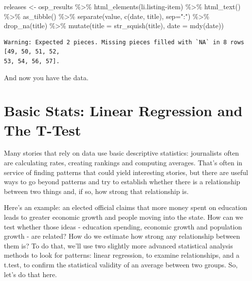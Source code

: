 \documentclass[
  letterpaper,
  DIV=11,
  numbers=noendperiod]{scrreprt}
\newenvironment{Shaded}{\begin{snugshade}}{\end{snugshade}}
\newcommand{\AttributeTok}[1]{\textcolor[rgb]{0.40,0.45,0.13}{#1}}
\newcommand{\FunctionTok}[1]{\textcolor[rgb]{0.28,0.35,0.67}{#1}}
\newcommand{\NormalTok}[1]{\textcolor[rgb]{0.00,0.23,0.31}{#1}}
\newcommand{\OtherTok}[1]{\textcolor[rgb]{0.00,0.23,0.31}{#1}}
\newcommand{\SpecialCharTok}[1]{\textcolor[rgb]{0.37,0.37,0.37}{#1}}
\newcommand{\StringTok}[1]{\textcolor[rgb]{0.13,0.47,0.30}{#1}}
\begin{document}
\begin{Shaded}
\begin{Highlighting}[]
\NormalTok{releases }\OtherTok{\textless{}{-}}\NormalTok{ osp\_results }\SpecialCharTok{\%\textgreater{}\%} \FunctionTok{html\_elements}\NormalTok{(}\StringTok{\textquotesingle{}li.listing{-}item\textquotesingle{}}\NormalTok{) }\SpecialCharTok{\%\textgreater{}\%} \FunctionTok{html\_text}\NormalTok{() }\SpecialCharTok{\%\textgreater{}\%} \FunctionTok{as\_tibble}\NormalTok{() }\SpecialCharTok{\%\textgreater{}\%} \FunctionTok{separate}\NormalTok{(value, }\FunctionTok{c}\NormalTok{(}\StringTok{\textquotesingle{}date\textquotesingle{}}\NormalTok{, }\StringTok{\textquotesingle{}title\textquotesingle{}}\NormalTok{), }\AttributeTok{sep=}\StringTok{":"}\NormalTok{) }\SpecialCharTok{\%\textgreater{}\%} \FunctionTok{drop\_na}\NormalTok{(title) }\SpecialCharTok{\%\textgreater{}\%} \FunctionTok{mutate}\NormalTok{(}\AttributeTok{title =} \FunctionTok{str\_squish}\NormalTok{(title), }\AttributeTok{date =} \FunctionTok{mdy}\NormalTok{(date))}
\end{Highlighting}
\end{Shaded}

\begin{verbatim}
Warning: Expected 2 pieces. Missing pieces filled with `NA` in 8 rows [49, 50, 51, 52,
53, 54, 56, 57].
\end{verbatim}

And now you have the data.


\hypertarget{basic-stats-linear-regression-and-the-t-test}{%
\chapter{Basic Stats: Linear Regression and The
T-Test}\label{basic-stats-linear-regression-and-the-t-test}}

Many stories that rely on data use basic descriptive statistics:
journalists often are calculating rates, creating rankings and computing
averages. That's often in service of finding patterns that could yield
interesting stories, but there are useful ways to go beyond patterns and
try to establish whether there is a relationship between two things and,
if so, how strong that relationship is.

Here's an example: an elected official claims that more money spent on
education leads to greater economic growth and people moving into the
state. How can we test whether those ideas - education spending,
economic growth and population growth - are related? How do we estimate
how strong any relationship between them is? To do that, we'll use two
slightly more advanced statistical analysis methods to look for
patterns: linear regression, to examine relationships, and a t.test, to
confirm the statistical validity of an average between two groups. So,
let's do that here.
\end{document}
